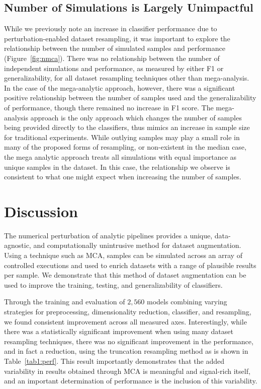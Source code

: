 \documentclass[10pt]{SelfArx} %
\begin{document}
\subsection*{Number of Simulations is Largely Unimpactful}

While we previously note an increase in classifier performance due to perturbation-enabled dataset resampling, it was
important to explore the relationship between the number of simulated samples and performance (Figure~\ref{fig:nmca}).
There was no relationship between the number of independent simulations and performance, as measured by either F1 or
generalizability, for all dataset resampling techniques other than mega-analysis. In the case of the mega-analytic
approach, however, there was a significant positive relationship between the number of samples used and the
generalizability of performance, though there remained no increase in F1 score. The mega-analysis approach is the only
approach which changes the number of samples being provided directly to the classifiers, thus mimics an increase in
sample size for traditional experiments. While outlying samples may play a small role in many of the proposed forms of
resampling, or non-existent in the median case, the mega analytic approach treats all simulations with equal importance
as unique samples in the dataset. In this case, the relationship we observe is consistent to what one might expect when
increasing the number of samples.

\section*{Discussion}

The numerical perturbation of analytic pipelines provides a unique, data-agnostic, and computationally unintrusive
method for dataset augmentation. Using a technique such as MCA, samples can be simulated across an array of controlled
executions and used to enrich datasets with a range of plausible results per sample. We demonstrate that this method of
dataset augmentation can be used to improve the training, testing, and generalizability of classifiers.

Through the training and evaluation of $2,560$ models combining varying strategies for preprocessing, dimensionality
reduction, classifier, and resampling, we found consistent improvement across all measured axes. Interestingly, while
there was a statistically significant improvement when using many dataset resampling techniques, there was no
significant improvement in the performance, and in fact a reduction, using the truncation resampling method as is shown
in Table~\ref{tab1:perf}. This result importantly demonstrates that the added variability in results obtained through
MCA is meaningful and signal-rich itself, and an important determination of performance is the inclusion of this
variability.
\end{document}
